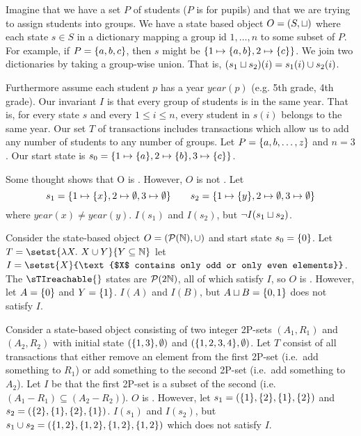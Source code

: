 \begin{example}
  Imagine that we have a set $P$ of students ($P$ is for pupils) and that we
  are trying to assign students into groups. We have a state based object $O =
  (S, \sqcup)$ where each state $s \in S$ in a dictionary mapping a group id $1,
  \ldots, n$ to some subset of $P$. For example, if $P = \{a, b, c\}$, then
  $s$ might be $\{1 \mapsto \{a, b\}, 2 \mapsto \{c\}\}$. We join two
  dictionaries by taking a group-wise union. That is, $(s_1 \sqcup s_2)(i) =
  s_1(i) \cup s_2(i)$.

  Furthermore assume each student $p$ has a year $year(p)$ (e.g. 5th grade, 4th
  grade). Our invariant $I$ is that every group of students is in the same
  year. That is, for every state $s$ and every $1 \leq i \leq n$, every student
  in $s(i)$ belongs to the same year.
  Our set $T$ of transactions includes transactions which allow us to add any
  number of students to any number of groups.
  Let $P = \{a, b, \ldots, z\}$ and $n = 3$. Our start state is $s_0 = \{1
  \mapsto \{a\}, 2 \mapsto \{b\}, 3 \mapsto \{c\}\}$.

  Some thought shows that O is \sTIconfluent{}. However, $O$ is not \Iclosed{}. Let
  \[
    s_1 = \{1 \mapsto \{x\}, 2 \mapsto \emptyset, 3 \mapsto \emptyset\}
    \qquad
    s_2 = \{1 \mapsto \{y\}, 2 \mapsto \emptyset, 3 \mapsto \emptyset\}
  \]
  where $year(x) \neq year(y)$. $I(s_1)$ and $I(s_2)$, but $\lnot I(s_1 \sqcup
  s_2)$.
\end{example}

\begin{example}
  Consider the state-based object $O = (\mathcal{P}(\mathbb{N}), \cup)$ and start
  state $s_0 = \{0\}$. Let $T = \setst{\lambda X.\ X \cup Y}{Y \subseteq
  \nats}$ let $I = \setst{X}{\text{$X$ contains only odd or only even
  elements}}$. The $\sTIreachable{}$ states are $\mathcal{P}(2\mathbb{N})$, all of
  which satisfy $I$, so $O$ is \sTIconfluent{}.  However, let $A = \{0\}$ and
  $Y = \{1\}$. $I(A)$ and $I(B)$, but $A \sqcup B = \{0, 1\}$ does not
  satisfy $I$.
\end{example}

\begin{example}
  Consider a state-based object consisting of two integer 2P-sets $(A_1, R_1)$
  and $(A_2, R_2)$ with initial state $(\{1, 3\}, \emptyset{})$ and $(\{1,
  2, 3, 4\}, \emptyset{})$. Let $T$ consist of all transactions that either
  remove an element from the first 2P-set (i.e.\ add something to $R_1$) or add
  something to the second 2P-set (i.e.\ add something to $A_2$). Let $I$ be
  that the first 2P-set is a subset of the second (i.e. $(A_1 - R_1) \subseteq
  (A_2 - R_2)$).
  $O$ is \sTIconfluent{}. However, let $s_1 = (\{1\}, \{2\}, \{1\},
  \{2\})$ and $s_2 = (\{2\}, \{1\}, \{2\}, \{1\})$. $I(s_1)$ and
  $I(s_2)$, but $s_1 \cup s_2 = (\{1, 2\}, \{1, 2\}, \{1, 2\}, \{1,
  2\})$ which does not satisfy $I$.
\end{example}
